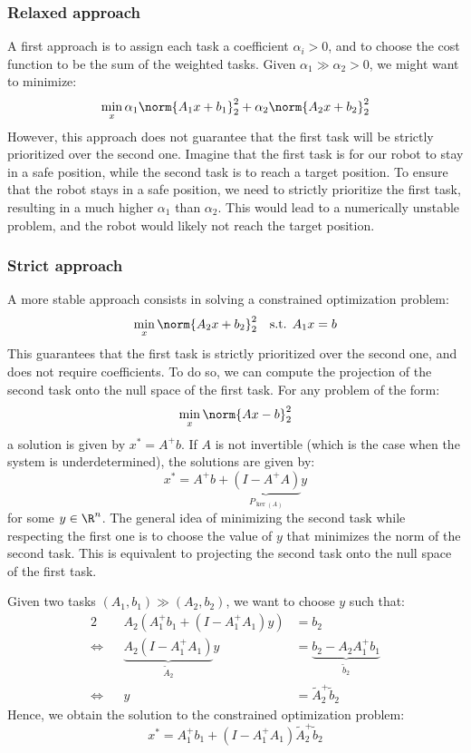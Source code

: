 \subsubsection{Relaxed approach}
A first approach is to assign each task a coefficient $\alpha_i>0$, and to choose the cost function to be the sum of the weighted tasks. Given $\alpha_1\gg\alpha_2>0$, we might want to minimize:
\begin{equation*}
    \min_x\alpha_1\norm{A_1x+b_1}_2^2 + \alpha_2\norm{A_2x+b_2}_2^2
\end{equation*}
However, this approach does not guarantee that the first task will be strictly prioritized over the second one. Imagine that the first task is for our robot to stay in a safe position, while the second task is to reach a target position. To ensure that the robot stays in a safe position, we need to strictly prioritize the first task, resulting in a much higher $\alpha_1$ than $\alpha_2$. This would lead to a numerically unstable problem, and the robot would likely not reach the target position.

\subsubsection{Strict approach}
A more stable approach consists in solving a constrained optimization problem:
\begin{equation*}
    \min_x\norm{A_2x+b_2}_2^2 \quad\text{s.t. } A_1x=b
\end{equation*}
This guarantees that the first task is strictly prioritized over the second one, and does not require coefficients. To do so, we can compute the projection of the second task onto the null space of the first task. For any problem of the form:
\begin{equation*}
    \min_x\norm{Ax-b}_2^2
\end{equation*}
a solution is given by $x^*=A^+b$. If $A$ is not invertible (which is the case when the system is underdetermined), the solutions are given by:
\begin{equation*}
    x^* = A^+b + \underbrace{(I-A^+A)}_{P_{\ker(A)}}y
\end{equation*}
for some $y\in\R^n$. The general idea of minimizing the second task while respecting the first one is to choose the value of $y$ that minimizes the norm of the second task. This is equivalent to projecting the second task onto the null space of the first task.

Given two tasks $(A_1, b_1)\gg(A_2, b_2)$, we want to choose $y$ such that:
\begin{alignat*}{2}
    &&A_2(A_1^+b_1 + (I-A_1^+A_1)y) &= b_2\\
    \iff &&\underbrace{A_2(I-A_1^+A_1)}_{\tilde{A}_2}y &= \underbrace{b_2 - A_2A_1^+b_1}_{\tilde{b}_2}\\
    \iff &&y &= \tilde{A}_2^+\tilde{b}_2
\end{alignat*}
Hence, we obtain the solution to the constrained optimization problem:
\begin{equation*}
    x^* = A_1^+b_1 + (I-A_1^+A_1)\tilde{A}_2^+\tilde{b}_2
\end{equation*}